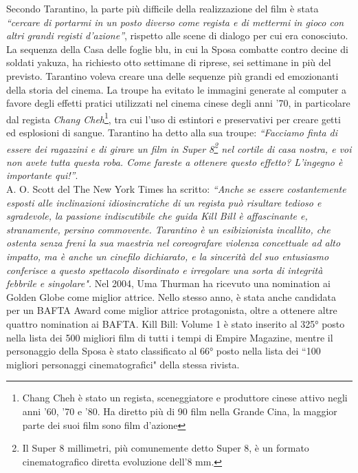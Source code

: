 \documentclass[12pt]{article} %
\begin{document}
\begin{flushleft}
    Secondo Tarantino, la parte più difficile della realizzazione del film è stata \textit{“cercare di portarmi in un posto diverso come regista e di mettermi in gioco con altri grandi registi d'azione”}, rispetto alle scene di dialogo per cui era conosciuto. La sequenza della Casa delle foglie blu, in cui la Sposa combatte contro decine di soldati yakuza, ha richiesto otto settimane di riprese, sei settimane in più del previsto. Tarantino voleva creare una delle sequenze più grandi ed emozionanti della storia del cinema. La troupe ha evitato le immagini generate al computer a favore degli effetti pratici utilizzati nel cinema cinese degli anni '70, in particolare dal regista \textit{Chang Cheh}\footnote{Chang Cheh è stato un regista, sceneggiatore e produttore cinese attivo negli anni '60, '70 e '80. Ha diretto più di 90 film nella Grande Cina, la maggior parte dei suoi film sono film d'azione}, tra cui l'uso di estintori e preservativi per creare getti ed esplosioni di sangue. 
    Tarantino ha detto alla sua troupe: \textit{“Facciamo finta di essere dei ragazzini e di girare un film in Super 8\footnote{Il Super 8 millimetri, più comunemente detto Super 8, è un formato cinematografico diretta evoluzione dell'8 mm.} nel cortile di casa nostra, e voi non avete tutta questa roba. Come fareste a ottenere questo effetto? L'ingegno è importante qui!”}.
    \\\vspace{1cm}
    A. O. Scott del The New York Times ha scritto: \textit{``Anche se essere costantemente esposti alle inclinazioni idiosincratiche di un regista può risultare tedioso e sgradevole, la passione indiscutibile che guida Kill Bill è affascinante e, stranamente, persino commovente. Tarantino è un esibizionista incallito, che ostenta senza freni la sua maestria nel coreografare violenza concettuale ad alto impatto, ma è anche un cinefilo dichiarato, e la sincerità del suo entusiasmo conferisce a questo spettacolo disordinato e irregolare una sorta di integrità febbrile e singolare".}
    Nel 2004, Uma Thurman ha ricevuto una nomination ai Golden Globe come miglior attrice. Nello stesso anno, è stata anche candidata per un BAFTA Award come miglior attrice protagonista, oltre a ottenere altre quattro nomination ai BAFTA. Kill Bill: Volume 1 è stato inserito al 325° posto nella lista dei 500 migliori film di tutti i tempi di Empire Magazine, mentre il personaggio della Sposa è stato classificato al 66° posto nella lista dei ``100 migliori personaggi cinematografici" della stessa rivista.
    \\\vspace{1cm}

\end{flushleft}
\end{document}
